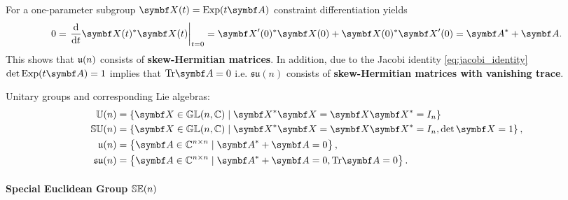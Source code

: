 For a one-parameter subgroup $\X(t) = \Exp(t \A)$ constraint differentiation yields
\begin{equation}
  0 = \left. \frac{\mathrm{d}}{\mathrm{d} t} \X(t)^* \X(t) \right|_{t=0} = \X'(0)^* \X(0) + \X(0)^* \X'(0) = \A^* + \A.
\end{equation}
This shows that ${\mathfrak{u}(n)}$ consists of \textbf{skew-Hermitian matrices}. In addition, due to the Jacobi identity \eqref{eq:jacobi_identity} $\det \Exp(t \A) = 1$ implies that $\tr \A = 0$ i.e. $\mathfrak{su}(n)$ consists of \textbf{skew-Hermitian matrices with vanishing trace}.
\begin{important}
  Unitary groups and corresponding Lie algebras:
  \begin{subequations}
    \begin{align}
      \Un              & = \left\{ \X \in \GL(n, \mathbb{C}) \mid \X^{*} \X = \X \X^{*}= I_{n} \right\} \\
      \SUn             & = \left\{ \X \in \GL(n, \mathbb{C}) \mid \X^{*} \X = \X \X^{*}= I_{n}, \det \X = 1 \right\},  \\
      \un              & = \left\{ \A \in \mathbb{C}^{n \times n} \mid \A^* + \A = 0 \right\},                                       \\
      \mathfrak{su}(n) & = \left\{ \A \in \mathbb{C}^{n \times n} \mid \A^* + \A = 0, \tr \A = 0 \right\}.
    \end{align}
  \end{subequations}
\end{important}

\paragraph{Special Euclidean Group ${\mathbb{SE}(n)}$}

